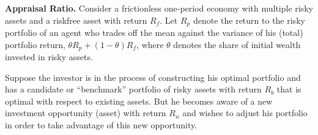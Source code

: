 \documentclass[11pt,green,twocol,citestyle=authoryear, bibstyle=authoryear]{elegantbook}
\begin{document}
\begin{problem}
    \textbf{Appraisal Ratio.} Consider a frictionless one-period economy with multiple risky assets and a riskfree asset with return $R_f$. Let $R_p$ denote the return to the risky portfolio of an agent who trades
    off the mean against the variance of his (total) portfolio return, $ \theta R_p + (1 - \theta) R_f $, where $\theta$ denotes the share of initial wealth invested in risky assets.

    Suppose the investor is in the process of constructing his optimal portfolio and has a candidate or “benchmark” portfolio of risky assets with return $R_b$ that is optimal with respect to existing assets. But he becomes aware of a new investment opportunity (asset) with return $R_n$ and wishes to adjust his portfolio in order to take advantage of this new opportunity.


\end{problem}
\end{document}
